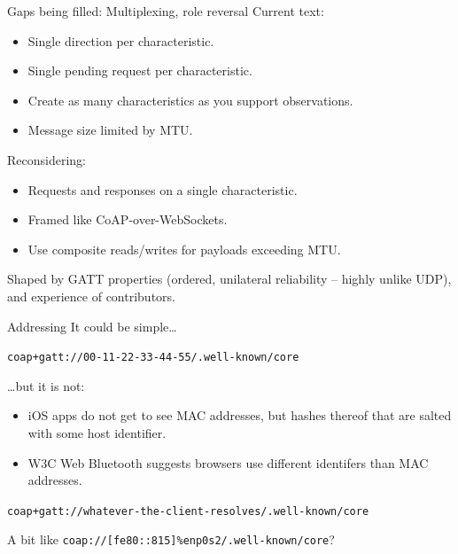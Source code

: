 \documentclass[aspectratio=169,colorlinks]{beamer}
\begin{document}
\begin{frame}{Gaps being filled: Multiplexing, role reversal}\large
	Current text:

	\begin{itemize}
		\item Single direction per characteristic.
		\item Single pending request per characteristic.
		\item Create as many characteristics as you support observations.
		\item Message size limited by MTU.
	\end{itemize}

	\pause
	Reconsidering:

	\begin{itemize}
		\item Requests and responses on a single characteristic.
		\item Framed like CoAP-over-WebSockets.
		\item Use composite reads/writes for payloads exceeding MTU.
	\end{itemize}

	\bigskip

	Shaped by GATT properties (ordered, unilateral reliability -- highly unlike UDP), and experience of contributors.
\end{frame}

\begin{frame}{Addressing}\Large
	It could be simple\ldots

	\texttt{coap+gatt://00-11-22-33-44-55/.well-known/core}
	
	\pause
	\bigskip

	\ldots but it is not:

	\begin{itemize}
		\item iOS apps do not get to see MAC addresses, but hashes thereof that are salted with some host identifier.
		\item W3C Web Bluetooth suggests browsers use different identifers than MAC addresses.
	\end{itemize}

	\texttt{coap+gatt://whatever-the-client-resolves/.well-known/core}

	\bigskip

	A bit like \texttt{coap://[fe80::815]\%enp0s2/.well-known/core}?
\end{frame}
\end{document}
